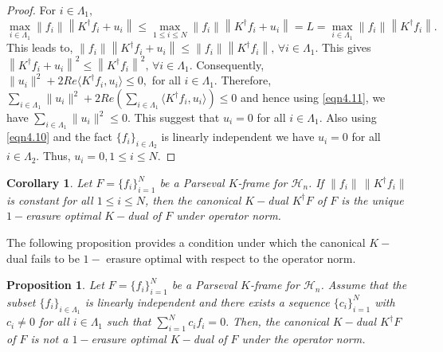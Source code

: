 \documentclass[final,1p,times]{elsarticle}
\newtheorem{prop}[thm]{Proposition}
\newtheorem{cor}[thm]{Corollary}
\begin{document}
\begin{proof}
 For $i \in \Lambda_1,\;$ $\max\limits_{i \in \Lambda_1} \|f_i\|\left\|K^\dag f_i + u_i\right\| \leq \max\limits_{1 \leq i \leq N} \|f_i\|\left\|K^\dag f_i + u_i\right\| = L = \max\limits_{i \in \Lambda_1} \|f_i\|\left\|K^\dag f_i \right\|. $ This leads to, $\|f_i\|\left\|K^\dag f_i + u_i\right\| \leq \|f_i\|\left\|K^\dag f_i \right\|,\,\forall i \in \Lambda_1.  $ This gives $\left\|K^\dag f_i + u_i\right\|^2 \leq \left\|K^\dag f_i \right\|^2,\,\forall i \in \Lambda_1. $ Consequently, $\|u_i\|^2 + 2 Re\langle K^\dag f_i, u_i\rangle \leq 0,$  for all $ i \in \Lambda_1.$ Therefore, $\sum\limits_{i \in \Lambda_1}\|u_i\|^2 + 2 Re \left(\sum\limits_{i \in \Lambda_1}\langle K^\dag f_i, u_i\rangle \right)\leq 0$ and hence using \eqref{eqn4.11}, we have 
$\sum\limits_{i \in \Lambda_1}\|u_i\|^2 \leq 0.$ This suggest that $u_i =0$  for all $ i \in \Lambda_1.$ Also using \eqref{eqn4.10} and  the fact  $\{f_i\}_{i \in \Lambda_2}$ is linearly independent we have $u_i =0$  for all $ i \in \Lambda_2.$ Thus, $u_i =0, 1 \leq i \leq N.$ 
\end{proof}

\begin{cor}
Let $F = \{f_i\}_{i=1}^N$ be a Parseval $K$-frame for $\mathcal{H}_n$. If  $\|f_i\|\,\|K^\dag f_i\|$ is constant for all $1 \leq i \leq N$, then the canonical $K-$dual $K^\dag F$ of $F$ is the unique $1-$erasure optimal $K-$dual of $F$ under operator norm.
\end{cor}

The following proposition provides a condition under which the canonical $K-$dual fails to be $1-$ erasure optimal with respect to the operator norm.


\begin{prop}
Let $F = \{f_i\}_{i=1}^N$ be a Parseval $K$-frame for $\mathcal{H}_n$. Assume that the subset $\{f_i\}_{i \in \Lambda_1}$ is linearly independent and there exists a sequence $\{c_i\}_{i=1}^N$ with $c_i \neq 0$ for all $i \in \Lambda_1$ such that $\sum_{i=1}^N c_i f_i = 0.$ Then, the canonical $K-$dual $K^\dag F$ of $F$ is not a $1-$erasure optimal $K-$dual of $F$ under the operator norm.
\end{prop}
\end{document}
